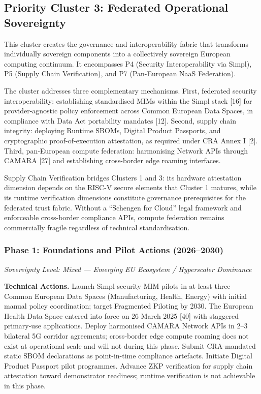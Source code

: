 \documentclass{ieeeaccess}
\begin{document}
\subsection{Priority Cluster 3: Federated Operational
Sovereignty}\label{priority-cluster-3-federated-operational-sovereignty}

This cluster creates the governance and interoperability fabric that
transforms individually sovereign components into a collectively
sovereign European computing continuum. It encompasses P4 (Security
Interoperability via Simpl), P5 (Supply Chain Verification), and P7
(Pan-European NaaS Federation).

The cluster addresses three complementary mechanisms. First, federated
security interoperability: establishing standardised MIMs within the
Simpl stack {[}16{]} for provider-agnostic policy enforcement across
Common European Data Spaces, in compliance with Data Act portability
mandates {[}12{]}. Second, supply chain integrity: deploying Runtime
SBOMs, Digital Product Passports, and cryptographic proof-of-execution
attestation, as required under CRA Annex I {[}2{]}. Third, pan-European
compute federation: harmonising Network APIs through CAMARA {[}27{]} and
establishing cross-border edge roaming interfaces.

Supply Chain Verification bridges Clusters 1 and 3: its hardware
attestation dimension depends on the RISC-V secure elements that Cluster
1 matures, while its runtime verification dimensions constitute
governance prerequisites for the federated trust fabric. Without a
``Schengen for Cloud'' legal framework and enforceable cross-border
compliance APIs, compute federation remains commercially fragile
regardless of technical standardisation.

\subsubsection{Phase 1: Foundations and Pilot Actions
(2026--2030)}\label{phase-1-foundations-and-pilot-actions-20262030-2}

\emph{Sovereignty Level: Mixed --- Emerging EU Ecosystem / Hyperscaler
Dominance}

\textbf{Technical Actions.} Launch Simpl security MIM pilots in at least
three Common European Data Spaces (Manufacturing, Health, Energy) with
initial manual policy coordination; target Fragmented Piloting by 2030.
The European Health Data Space entered into force on 26 March 2025
{[}40{]} with staggered primary-use applications. Deploy harmonised
CAMARA Network APIs in 2--3 bilateral 5G corridor agreements;
cross-border edge compute roaming does not exist at operational scale
and will not during this phase. Submit CRA-mandated static SBOM
declarations as point-in-time compliance artefacts. Initiate Digital
Product Passport pilot programmes. Advance ZKP verification for supply
chain attestation toward demonstrator readiness; runtime verification is
not achievable in this phase.
\end{document}
